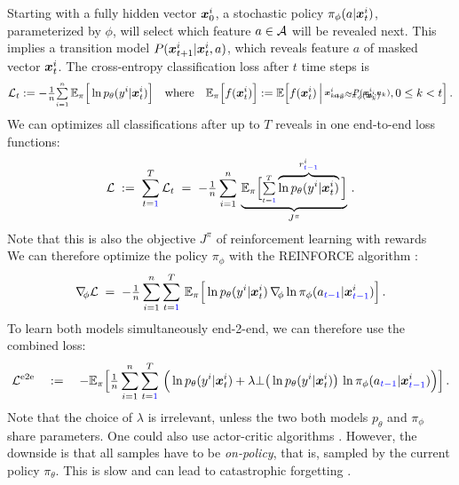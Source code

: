 Starting with a fully hidden vector $\bm x^i_0$, 
a stochastic policy $\pi_\phi(a|\bm x^i_t)$, parameterized by $\phi$,
will select which feature $a \in \mathcal{A}$ will be revealed next.
This implies a transition model $P(\bm x^i_{t+1}|\bm x^i_{t}, a)$, 
which reveals feature $a$ of masked vector $\bm x^i_t$.
The cross-entropy classification loss after $t$ time steps is
\begin{align}
	\Set L_t := -\smallfrac{1}{n} \smallsum{i=1}{n}\,  
	\E_\pi\Big[ \ln p_\theta(y^i|\ve x^i_t) \Big]
	\quad \text{where} \quad
	\E_\pi\Big[f(\ve x^i_t)\Big] := \E\Big[ f(\ve x^i_t) \,\Big|
		\stack{
		a_k \sim \pi_\phi(\ve x_k^i)
		\brs[-5mm]
		\ve x^i_{k+1} \sim P(\ve x^i_k, a_k)
		}\!, 0 \leq k < t
	\Big] \,.
\end{align}
We can optimizes all classifications after up to $T$ reveals 
in one end-to-end loss functions:
\begin{align}
	\mathcal{L} \;:=\; \sum_{t={\color{blue}1}}^T \mathcal{L}_t \;=\; 
	-{\textstyle \frac{1}{n}} \sum_{i=1}^{n}\,  
	\underbrace{\mathbb{E}_\pi\Big[ {\textstyle \sum\limits_{\scriptscriptstyle t={\color{blue}1}}^{\scriptscriptstyle T}} 
		\overbrace{\ln p_\theta(y^i| \bm x^i_t)}^{r^i_{\color{blue}t-1}} 
	\Big]}_{J^\pi} \,.
\end{align}
Note that this is also the objective $J^\pi$ of reinforcement learning
with rewards
 ~
We can therefore optimize the policy $\pi_\phi$
with the REINFORCE algorithm \citep{Williams92}:
\begin{align}
	\nabla\kern-0.5ex_{\phi} \mathcal{L} \;=\; 
	-{\textstyle \frac{1}{n}} \sum_{i=1}^{n} \sum_{t={\color{blue}1}}^{T}\,  
	\mathbb{E}_\pi\Big[ 
		\ln p_\theta(y^i| \bm x^i_t)  \,
		\nabla\kern-0.5ex_{\phi} \ln \pi_\phi(a_{\color{blue}t-1}| \bm x^i_{\color{blue}t-1}) \Big] \,.
\end{align}
To learn both models simultaneously end-2-end, we can therefore use the 
combined loss:
\begin{align}
	\mathcal{L}^\text{e2e} \quad:=\quad
	- \mathbb{E}_\pi\Big[
	{\textstyle \frac{1}{n}} \sum_{i=1}^{n} \sum_{t={\color{blue}1}}^{T}\,  \Big(
	 \ln p_\theta(y^i| \bm x^i_t) 
	+ \lambda \bot\big(\ln p_\theta(y^i| \bm x^i_t)\big)  \,
		\ln \pi_\phi(a_{\color{blue}t-1}| \bm x^i_{\color{blue}t-1}) \Big) \Big]\,.	
\end{align}
Note that the choice of $\lambda$ is irrelevant, 
unless the two both models $p_\theta$ and $\pi_\phi$ share parameters.
One could also use actor-critic algorithms \citep{Sutton00}.
However, the downside is that all samples have to be 
{\em on-policy}, that is, sampled by the current policy $\pi_\theta$.
This is slow and can lead to catastrophic forgetting
\citep[which can be counteracted by modern 
algorithms,][but this is another story]{Schulman15, Schulman17}.


